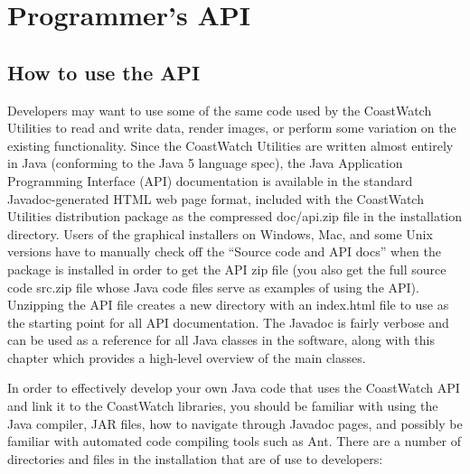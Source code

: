\chapter{Programmer's API}
\label{api}



{




\section{How to use the API}

Developers may want to use some of the same code used by the
CoastWatch Utilities to read and write data, render images, or
perform some variation on the existing functionality.  Since the
CoastWatch Utilities are written almost entirely in Java
(conforming to the Java 5 language spec), the Java Application
Programming Interface (API) documentation is available in the
standard Javadoc-generated HTML web page format, included with the
CoastWatch Utilities distribution package as the compressed
{\file doc/api.zip} file in the installation directory.  Users of
the graphical installers on Windows, Mac, and some Unix versions
have to manually check off the ``Source code and API docs'' when
the package is installed in order to get the API zip file (you
also get the full source code {\file src.zip} file whose Java code
files serve as examples of using the API).  Unzipping the API
file creates a new directory with an {\file index.html} file to
use as the starting point for all API documentation.  The Javadoc
is fairly verbose and can be used as a reference for all Java
classes in the software, along with this chapter which provides a
high-level overview of the main classes.

In order to effectively develop your own Java code that uses the
CoastWatch API and link it to the CoastWatch libraries, you
should be familiar with using the Java compiler, JAR files, how
to navigate through Javadoc pages, and possibly be familiar with
automated code compiling tools such as Ant.  There are a number
of directories and files in the installation that are of use to
developers:
\begin{description}


\end{description}}
